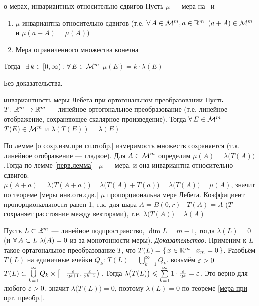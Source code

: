 \begin{teor}[https://www.youtube.com/live/Y10gq1j3ADI?si=PWNijQFbbR0Ia10-&t=8306]{о мерах, инвариантных относительно сдвигов}\label{меры инв.отн.сдв.}
	Пусть $\mu$ --- мера  на \m\ и 
	\begin{enumerate}
		\item $\mu$ инвариантна относительно сдвигов (т.е. $\forall \, A \in \mathcal{M}^m, a \in \mathbb R^m$ $(a + A) \in \mathcal{M}^m$ и $\mu(a + A) = \mu(A)$)
		
		\item Мера ограниченного множества конечна
	\end{enumerate}
	\hspace{20pt}Тогда$\E k \in [0, \infty) : \A E \in \m$ $\mu(E) = k \cdot \lambda (E)$ 
\end{teor}

\begin{prf}
	Без доказательства.
\end{prf}

\begin{teor}[https://www.youtube.com/live/Y10gq1j3ADI?si=7KD9370OVRWXYlc7&t=8780]{инвариантность меры Лебега при ортогональном преобразовании}\label{мера при орт. преобр.}
	Пусть $T \colon \mathbb R^m \to \mathbb R^m$ --- линейное ортогональное преобразование (т.е. линейное отображение, сохраняющее скалярное произведение). Тогда $\forall \, E \in \mathcal{M}^m$ $T(E) \in \mathcal{M}^m$ и $\lambda(T(E)) = \lambda(E)$
\end{teor}

\begin{prf}
	По лемме \ref{о сохр.изм.при гл.отобр.} измеримость множеств сохраняется (т.к. линейное отображение --- гладкое). Для $A \in \mathcal{M}^m$ определим $\mu(A) = \lambda\bigl(T(A)\bigr)$.Тогда по лемме \ref{перв.лемма} \ $\mu$ --- мера, и она инвариантна относительно сдвигов: $\mu(A + a) = \lambda\bigl(T(A + a)\bigr) = \lambda\bigl(T(A) + T(a)\bigr) = \lambda\bigl(T(A)\bigr) = \mu(A)$, значит по теореме \ref{меры инв.отн.сдв.} $\mu$ пропорциональна мере Лебега. Коэффициент пропорциональности равен 1, т.к. для шара $A = B(0, r)$ \ $T(A) = A$ ($T$ --- сохраняет расстояние между векторами), т.е. $\lambda\bigl(T(A)\bigr) = \lambda(A)$
\end{prf}

\begin{slv}\label{мера подпр.}
	Пусть $L \subset \mathbb R^m$ --- линейное подпространство, $\dim L = m - 1$, тогда $\lambda(L) = 0$ (и $\forall \, A \subset L\ \lambda(A) = 0$ из-за монотонности меры). \textit{Доказательство:} Применим к $L$ такое ортагональное преобразование $T$, что $T(L) = \{\, x \in \mathbb R^m \mid x_m = 0\,\}$. Разобьём $T(L)$ на единичные ячейки $Q_k$: $T(L) = \bigcup\limits_{k = 1}^\infty Q_k$.  возьмём $\varepsilon > 0$ $T(L) \subset \bigcup\limits_{k = 1}^\infty Q_k \times \left[\left.-\frac{\varepsilon}{2^{k+1}}, \frac{\varepsilon}{2^{k+1}}\right)\right.$. Тогда $\lambda\bigl(T(L)\bigr) \leqslant \sum\limits_{k = 1}^\infty 1 \cdot \frac{\varepsilon}{2^k} = \varepsilon$. Это верно для любого $\varepsilon > 0$, значит $\lambda\bigl(T(L)\bigr) = 0$, поэтому $\lambda(L) = 0$ по теореме \ref{мера при орт. преобр.}.
\end{slv}

